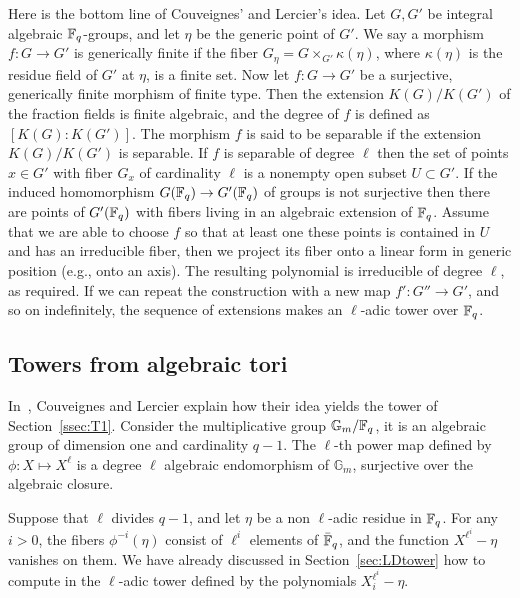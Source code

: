 \documentclass{sig-alternate}
\begin{document}
Here is the bottom line of Couveignes' and Lercier's idea. Let $G, G'$ be integral algebraic 
$\mathbb{F}_q$-groups, and let $\eta$ be the generic point of $G'$. We say a morphism $f: G \rightarrow 
G'$ is generically finite if the fiber $G_\eta = G \times_{G'} \kappa(\eta)$, where $\kappa(\eta)$ 
is the residue field of $G'$ at $\eta$, is a finite set. Now let $f: G \rightarrow G'$ be a 
surjective, generically finite morphism of finite type. Then the extension $K(G)/K(G')$ of the 
fraction fields is finite algebraic, and the degree of $f$ is defined as $[K(G): K(G')]$. The 
morphism $f$ is said to be separable if the extension $K(G)/K(G')$ is separable. If $f$ is 
separable of degree $\ell$ then the set of points $x \in G'$ with fiber $G_x$ of cardinality 
$\ell$ is a nonempty open subset $U \subset G'$. If the induced homomorphism $G(\mathbb{F}_q) \rightarrow 
G'(\mathbb{F}_q)$ of groups is not surjective then there are points of $G'(\mathbb{F}_q)$ with fibers living in an 
algebraic extension of $\mathbb{F}_q$. Assume that we are able to choose $f$ so that at least one these 
points is contained in $U$ and has an irreducible fiber, then we project its fiber onto a linear 
form in generic position (e.g., onto an axis). The resulting polynomial is irreducible of degree 
$\ell$, as required. If we can repeat the construction with a new map $f':G''\to G'$, and so on 
indefinitely, the sequence of extensions makes an $\ell$-adic tower over $\mathbb{F}_q$.






\subsection{Towers from algebraic tori}

In~\cite{couveignes+lercier11}, Couveignes and Lercier explain how
their idea yields the tower of Section~\ref{ssec:T1}. Consider the
multiplicative group $\mathbb{G}_m/\mathbb{F}_q$, it is an algebraic group of
dimension one and cardinality $q-1$.  The $\ell$-th power map defined
by $\phi:X\mapsto X^\ell$ is a degree $\ell$ algebraic endomorphism of
$\mathbb{G}_m$, surjective over the algebraic closure.

Suppose that $\ell$ divides $q-1$, and let $\eta$ be a non $\ell$-adic
residue in $\mathbb{F}_q$. For any $i>0$, the fibers $\phi^{-i}(\eta)$ consist
of $\ell^i$ elements of $\bar{\mathbb{F}}_q$, and the function
$X^{\ell^i}-\eta$ vanishes on them. We have already discussed in
Section~\ref{sec:LDtower} how to compute in the $\ell$-adic tower
defined by the polynomials $X_i^{\ell^i}-\eta$.
\end{document}
